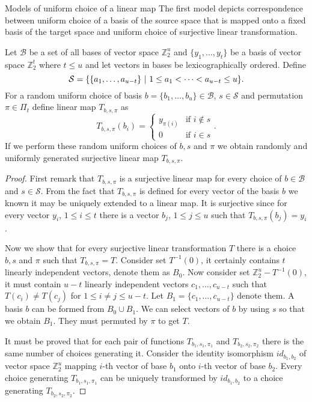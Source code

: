 \begin{section}{Models of uniform choice of a linear map}
The first model depicts correspondence between uniform choice of a basis of the source space that is mapped onto a fixed basis of the target space and uniform choice of surjective linear transformation.
\begin{remark}
Let $\mathcal{B}$ be a set of all bases of vector space $\mathbb{Z}_2^u$ and $\{y_1, \dots, y_t\}$ be a basis of vector space $\mathbb{Z}_2^t$ where $t \leq u$ and let vectors in bases be lexicographically ordered. Define \[\mathcal{S} = \{\{a_1, \dots, a_{u - t}\} \ | \  1 \leq a_1 < \dots < a_{u-t} \leq u \} \text{.} \] For a random uniform choice of basis $b = \{b_1, \dots, b_u\} \in \mathcal{B}$, $s \in \mathcal{S}$ and permutation $\pi \in \Pi_t$ define linear map $T_{b, s, \pi}$ as
\[
T_{b, s, \pi}(b_i) =  
  \begin{cases} 
    y_{\pi(i)} & \text{if } i \notin s \\
    0 & \text{if } i \in s
  \end{cases} \text{.}
\]
If we perform these random uniform choices of $b, s$ and $\pi$ we obtain randomly and uniformly generated surjective linear map $T_{b, s, \pi}$.
\end{remark}
\begin{proof}
First remark that $T_{b, s, \pi}$ is a surjective linear map for every choice of $b \in \mathcal{B}$ and $s \in \mathcal{S}$. From the fact that $T_{b, s, \pi}$ is defined for every vector of the basis $b$ we known it may be uniquely extended to a linear map. It is surjective since for every vector $y_i$, $1 \leq i \leq t$ there is a vector $b_j$, $1 \leq j \leq u$ such that $T_{b, s, \pi}(b_j) = y_i$. 

Now we show that for every surjective linear transformation $T$ there is a choice $b, s$ and $\pi$ such that $T_{b, s, \pi} = T$. Consider set $T^{-1}(0)$, it certainly contains $t$ linearly independent vectors, denote them as $B_0$. Now consider set $\mathbb{Z}_2^u - T^{-1}(0)$, it must contain $u - t$ linearly independent vectors $c_1, \dots, c_{u-t}$ such that $T(c_i) \neq T(c_j)$ for $1 \leq i \neq j \leq u - t$. Let $B_1 = \{c_1, \dots, c_{u - t}\}$ denote them. A basis $b$ can be formed from $B_0 \cup B_1$. We can select vectors of $b$ by using $s$ so that we obtain $B_1$. They must permuted by $\pi$ to get $T$. 

It must be proved that for each pair of functions $T_{b_1, s_1, \pi_1}$ and $T_{b_2, s_2, \pi_2}$ there is the same number of choices generating it. Consider the identity isomorphism $id_{b_1, b_2}$ of vector space $\mathbb{Z}_2^u$ mapping $i$-th vector of base $b_1$ onto $i$-th vector of base $b_2$. Every choice generating $T_{b_1, s_1, \pi_1}$ can be uniquely transformed by $id_{b_1, b_2}$ to a choice generating $T_{b_2, s_2, \pi_2}$.
\end{proof}


\end{section}
